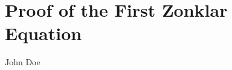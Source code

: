 \documentclass[conference]{IEEEtran}
\begin{document}
\appendices
\section{Proof of the First Zonklar Equation}
\blindtext


\ifCLASSOPTIONcaptionsoff
  \newpage
\fi





%
%
%



% 

\begin{IEEEbiography}{John Doe}
\blindtext
\end{IEEEbiography}







\end{document}
